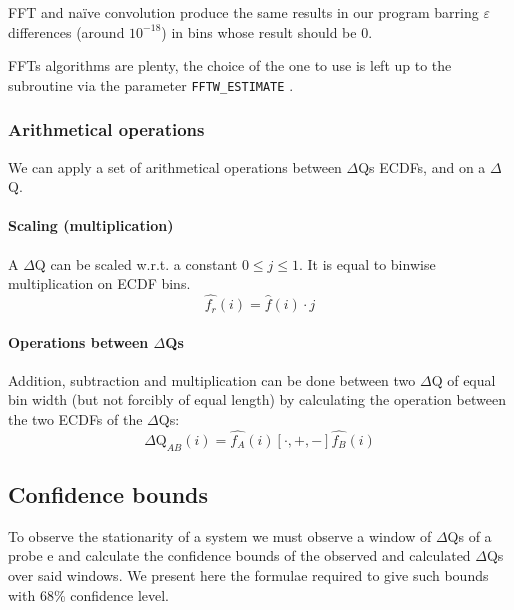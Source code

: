    FFT and naïve convolution produce the same results in our program barring $\varepsilon$ differences (around $10^{-18}$) in bins whose result should be 0.
    
    FFTs algorithms are plenty, the choice of the one to use is left up to the subroutine via the parameter \texttt{FFTW\_ESTIMATE} \cite{fft-h}.

    \subsubsection{Arithmetical operations}
        We can apply a set of arithmetical operations between $\Delta$Qs ECDFs, and on a $\Delta$Q.
    \paragraph{Scaling (multiplication)} A $\Delta$Q can be scaled w.r.t. a constant $0 \le j \le 1$. It is equal to binwise multiplication on ECDF bins.
    \begin{equation}
        \hat{f_r}(i) = \hat{f}(i) \cdot j
        \label{eq:mul_ecdf}
    \end{equation}

    \paragraph{Operations between $\Delta$Qs} 
        Addition, subtraction and multiplication can be done between two $\Delta$Q of equal bin width (but not forcibly of equal length) by calculating the operation between the two ECDFs of the $\Delta$Qs:
        \begin{equation}
            \Delta \text{Q}_{AB}(i) = \hat{f_A}(i) [\cdot, +, -] \hat{f_B}(i)
            \label{eq:op_dq}
        \end{equation}


    \subsection{Confidence bounds}
       To observe the stationarity of a system we must observe a window of $\Delta$Qs of a probe e and calculate the confidence bounds of the observed and calculated $\Delta$Qs over said windows. We present here the formulae required to give such bounds with 68\% confidence level. 

